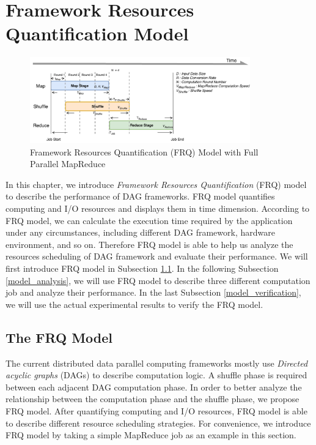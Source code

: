 {\color{blue}
\section{Framework Resources Quantification Model}\label{model}

\begin{figure}
    \centering
	\includegraphics[width=0.85\textwidth]{fig/model_basic}
	\caption{\color{blue}Framework Resources Quantification (FRQ) Model with Full Parallel MapReduce}
    \label{fig:model_basic}
    \vspace{-1em}
\end{figure}

In this chapter, we introduce \textit{Framework Resources Quantification} (FRQ) model to describe the performance of DAG frameworks.
FRQ model quantifies computing and I/O resources and displays them in time dimension. According to FRQ model, we can calculate the execution time required by the application under any circumstances, including different DAG framework, hardware environment, and so on. Therefore FRQ model is able to help us analyze the resources scheduling of DAG framework and evaluate their performance. We will first introduce FRQ model in Subsection \ref{model_overview}. In the following Subsection \ref{model_analysis}, we will use FRQ model to describe three different computation job and analyze their performance. In the last Subsection \ref{model_verification}, we will use the actual experimental results to verify the FRQ model.

\subsection{The FRQ Model}\label{model_overview}
The current distributed data parallel computing frameworks mostly use \textit{Directed acyclic graphs} (DAGs) to describe computation logic. A shuffle phase is required between each adjacent DAG computation phase. In order to better analyze the relationship between the computation phase and the shuffle phase, we propose FRQ model. After quantifying computing and I/O resources, FRQ model is able to describe different resource scheduling strategies. For convenience, we introduce FRQ model by taking a simple MapReduce job as an example in this section.

}
